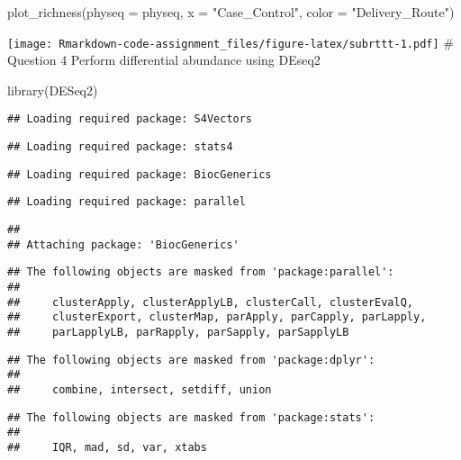 \documentclass[
]{article}
\newenvironment{Shaded}{\begin{snugshade}}{\end{snugshade}}
\newcommand{\AttributeTok}[1]{\textcolor[rgb]{0.77,0.63,0.00}{#1}}
\newcommand{\FunctionTok}[1]{\textcolor[rgb]{0.00,0.00,0.00}{#1}}
\newcommand{\NormalTok}[1]{#1}
\newcommand{\StringTok}[1]{\textcolor[rgb]{0.31,0.60,0.02}{#1}}
\begin{document}
\begin{Shaded}
\begin{Highlighting}[]
\FunctionTok{plot\_richness}\NormalTok{(}\AttributeTok{physeq =}\NormalTok{ physeq, }\AttributeTok{x =} \StringTok{"Case\_Control"}\NormalTok{, }\AttributeTok{color =} \StringTok{"Delivery\_Route"}\NormalTok{)}
\end{Highlighting}
\end{Shaded}

\texttt{[image: Rmarkdown-code-assignment\_files/figure-latex/subrttt-1.pdf]}
\# Question 4 Perform differential abundance using DEseq2

\begin{Shaded}
\begin{Highlighting}[]
\FunctionTok{library}\NormalTok{(DESeq2)}
\end{Highlighting}
\end{Shaded}

\begin{verbatim}
## Loading required package: S4Vectors
\end{verbatim}

\begin{verbatim}
## Loading required package: stats4
\end{verbatim}

\begin{verbatim}
## Loading required package: BiocGenerics
\end{verbatim}

\begin{verbatim}
## Loading required package: parallel
\end{verbatim}

\begin{verbatim}
## 
## Attaching package: 'BiocGenerics'
\end{verbatim}

\begin{verbatim}
## The following objects are masked from 'package:parallel':
## 
##     clusterApply, clusterApplyLB, clusterCall, clusterEvalQ,
##     clusterExport, clusterMap, parApply, parCapply, parLapply,
##     parLapplyLB, parRapply, parSapply, parSapplyLB
\end{verbatim}

\begin{verbatim}
## The following objects are masked from 'package:dplyr':
## 
##     combine, intersect, setdiff, union
\end{verbatim}

\begin{verbatim}
## The following objects are masked from 'package:stats':
## 
##     IQR, mad, sd, var, xtabs
\end{verbatim}
\end{document}
